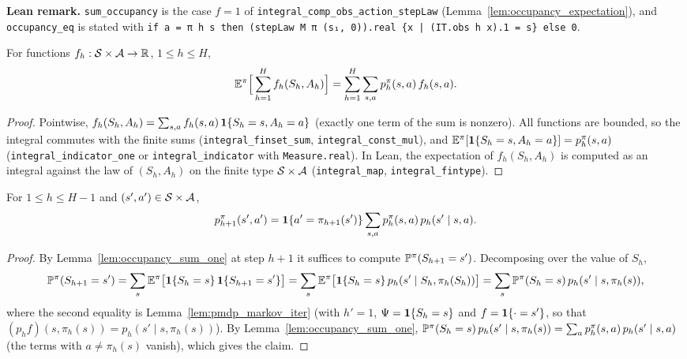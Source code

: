 \textbf{Lean remark.} \texttt{sum\_occupancy} is the case $f = 1$ of
\texttt{integral\_comp\_obs\_action\_stepLaw} (Lemma~\ref{lem:occupancy_expectation}), and
\texttt{occupancy\_eq} is stated with \texttt{if a = π h s then (stepLaw M π (s₁, 0)).real \{x | (IT.obs h x).1 = s\} else 0}.

\begin{lemma}\label{lem:occupancy_expectation}
\leanok
{}
For functions $f_h : \mathcal{S} \times \mathcal{A} \to \mathbb{R}$, $1 \le h \le H$,
\[
  \mathbb{E}^\pi\Big[\sum_{h=1}^H f_h(S_h, A_h)\Big] = \sum_{h=1}^H\sum_{s,a} p^\pi_h(s,a)\, f_h(s,a) .
\]
\end{lemma}

\begin{proof}
\leanok
Pointwise, $f_h(S_h, A_h) = \sum_{s,a} f_h(s,a)\,\mathbf{1}\{S_h = s, A_h = a\}$ (exactly one term
of the sum is nonzero). All functions are bounded, so the integral commutes with the finite
sums (\texttt{integral\_finset\_sum}, \texttt{integral\_const\_mul}), and
$\mathbb{E}^\pi[\mathbf{1}\{S_h = s, A_h = a\}] = p^\pi_h(s,a)$ (\texttt{integral\_indicator\_one} or
\texttt{integral\_indicator} with \texttt{Measure.real}). In Lean, the expectation of
$f_h(S_h, A_h)$ is computed as an integral against the law of $(S_h, A_h)$ on the finite type
$\mathcal{S} \times \mathcal{A}$ (\texttt{integral\_map}, \texttt{integral\_fintype}).
\end{proof}

\begin{lemma}\label{lem:occupancy_recursion}
\leanok
{}
For $1 \le h \le H - 1$ and $(s', a') \in \mathcal{S} \times \mathcal{A}$,
\[
  p^\pi_{h+1}(s', a') = \mathbf{1}\{a' = \pi_{h+1}(s')\}\sum_{s,a} p^\pi_h(s,a)\, p_h(s' \mid s, a) .
\]
\end{lemma}

\begin{proof}
\leanok
By Lemma~\ref{lem:occupancy_sum_one} at step $h + 1$ it suffices to compute
$\mathbb{P}^\pi(S_{h+1} = s')$. Decomposing over the value of $S_h$,
\[
  \mathbb{P}^\pi(S_{h+1} = s') = \sum_{s}\mathbb{E}^\pi\big[\mathbf{1}\{S_h = s\}\,\mathbf{1}\{S_{h+1} = s'\}\big]
  = \sum_{s}\mathbb{E}^\pi\big[\mathbf{1}\{S_h = s\}\,p_h(s' \mid S_h, \pi_h(S_h))\big]
  = \sum_{s}\mathbb{P}^\pi(S_h = s)\,p_h(s' \mid s, \pi_h(s)) ,
\]
where the second equality is Lemma~\ref{lem:pmdp_markov_iter} (with $h' = 1$,
$\Psi = \mathbf{1}\{S_h = s\}$ and $f = \mathbf{1}\{\cdot = s'\}$, so that $(p_h f)(s, \pi_h(s)) = p_h(s' \mid s, \pi_h(s))$).
By Lemma~\ref{lem:occupancy_sum_one}, $\mathbb{P}^\pi(S_h = s)\,p_h(s'\mid s, \pi_h(s)) = \sum_a p^\pi_h(s,a)\,p_h(s' \mid s, a)$
(the terms with $a \ne \pi_h(s)$ vanish), which gives the claim.
\end{proof}

